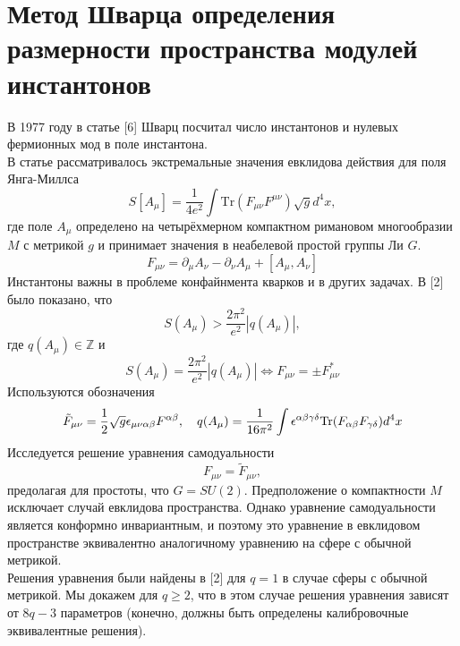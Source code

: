 \documentclass[12pt]{article}
\theoremstyle{definition}
\begin{document}
\section{Метод Шварца определения размерности пространства модулей инстантонов}
В 1977 году в статье [6] Шварц посчитал число инстантонов и нулевых фермионных мод в поле инстантона.\\
В статье рассматривалось экстремальные значения евклидова действия для поля Янга-Миллса
\begin{equation}
    S[A_\mu]=\frac{1}{4e^2}\int\text{Tr}(F_{\mu\nu}F^{\mu\nu})\sqrt{g}d^4x,
\end{equation}
где поле $A_\mu$ определено на четырёхмерном компактном римановом многообразии $M$ с метрикой $g$ и принимает значения в неабелевой простой группы Ли $G$.
\begin{equation}
    F_{\mu\nu}=\partial_\mu A_\nu-\partial_\nu A_\mu+[A_\mu,A_\nu]
\end{equation}
Инстантоны важны в проблеме конфайнмента кварков и в других задачах. В [2] было показано, что
\begin{equation}
    S(A_\mu)>\frac{2\pi^2}{e^2}|q(A_\mu)|,
\end{equation}
где $q(A_\mu)\in\mathbb{Z}$ и
\begin{equation}
    S(A_\mu)=\frac{2\pi^2}{e^2}|q(A_\mu)|\Leftrightarrow F_{\mu\nu}=\pm F^*_{\mu\nu}
\end{equation}
Используются обозначения
\begin{equation}
    \Tilde{F}_{\mu\nu}=\frac{1}{2}\sqrt{g}\epsilon_{\mu\nu\alpha\beta}F^{\alpha\beta},\quad q(A_\mu)=\frac{1}{16\pi^2}\int\epsilon^{\alpha\beta\gamma\delta}\text{Tr}(F_{\alpha\beta}F_{\gamma\delta})d^4x
\end{equation}
Исследуется решение уравнения самодуальности 
\begin{equation}
    F_{\mu\nu}=\tilde{F}_{\mu\nu},
\end{equation}
предолагая для простоты, что $G=SU(2)$. Предположение о компактности $M$ исключает случай евклидова пространства. Однако уравнение самодуальности является конформно инвариантным, и поэтому это уравнение в евклидовом пространстве эквивалентно аналогичному уравнению на сфере с обычной метрикой.\\
Решения уравнения были найдены в [2] для $q=1$ в случае сферы с обычной метрикой. Мы докажем для $q\geq2$, что в этом случае решения уравнения зависят от $8q-3$ параметров (конечно, должны быть определены калибровочные эквивалентные решения).\\
\end{document}
